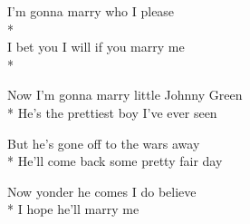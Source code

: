 

\versemark
I’m gonna marry who I please\\*
\vin{}\\
I bet you I will if you marry me\\*
\vin{}

\versemark
Now I’m gonna marry little Johnny Green\etc\\*
He’s the prettiest boy I’ve ever seen\etc %

\versemark
But he’s gone off to the wars away\etc\\*
He’ll come back some pretty fair day\etcrefrain

\versemark
Now yonder he comes I do believe\etc\\*
I hope he’ll marry me\etcrefrain

